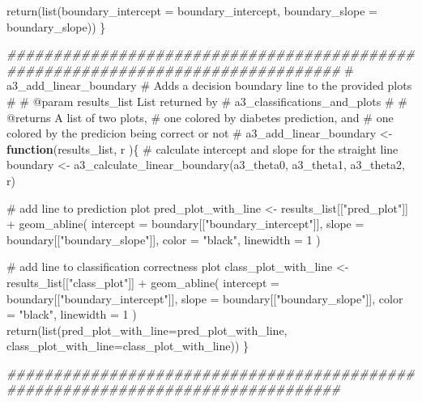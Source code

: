 \documentclass[
  english,
  11pt,
]{article}
\newenvironment{Shaded}{\begin{snugshade}}{\end{snugshade}}
\newcommand{\AttributeTok}[1]{\textcolor[rgb]{0.40,0.45,0.13}{#1}}
\newcommand{\CommentTok}[1]{\textcolor[rgb]{0.37,0.37,0.37}{#1}}
\newcommand{\ControlFlowTok}[1]{\textcolor[rgb]{0.00,0.23,0.31}{\textbf{#1}}}
\newcommand{\DecValTok}[1]{\textcolor[rgb]{0.68,0.00,0.00}{#1}}
\newcommand{\DocumentationTok}[1]{\textcolor[rgb]{0.37,0.37,0.37}{\textit{#1}}}
\newcommand{\FunctionTok}[1]{\textcolor[rgb]{0.28,0.35,0.67}{#1}}
\newcommand{\NormalTok}[1]{\textcolor[rgb]{0.00,0.23,0.31}{#1}}
\newcommand{\OtherTok}[1]{\textcolor[rgb]{0.00,0.23,0.31}{#1}}
\newcommand{\SpecialCharTok}[1]{\textcolor[rgb]{0.37,0.37,0.37}{#1}}
\newcommand{\StringTok}[1]{\textcolor[rgb]{0.13,0.47,0.30}{#1}}
\begin{document}
\begin{Shaded}
\begin{Highlighting}[]
  \FunctionTok{return}\NormalTok{(}\FunctionTok{list}\NormalTok{(}\AttributeTok{boundary\_intercept =}\NormalTok{ boundary\_intercept,}
              \AttributeTok{boundary\_slope =}\NormalTok{  boundary\_slope))}
\NormalTok{\}}

\DocumentationTok{\#\#\#\#\#\#\#\#\#\#\#\#\#\#\#\#\#\#\#\#\#\#\#\#\#\#\#\#\#\#\#\#\#\#\#\#\#\#\#\#\#\#\#\#\#\#\#\#\#\#\#\#\#\#\#\#\#\#\#\#\#\#\#\#\#\#\#\#\#\#\#\#\#\#\#\#\#\#\#\#}
\CommentTok{\#\textquotesingle{} a3\_add\_linear\_boundary}
\CommentTok{\#\textquotesingle{} Adds a decision boundary line to the provided plots}
\CommentTok{\#\textquotesingle{}}
\CommentTok{\#\textquotesingle{} @param results\_list List returned by}
\CommentTok{\#\textquotesingle{} a3\_classifications\_and\_plots}
\CommentTok{\#\textquotesingle{}}
\CommentTok{\#\textquotesingle{} @returns A list of two plots,}
\CommentTok{\#\textquotesingle{} one colored by diabetes prediction, and}
\CommentTok{\#\textquotesingle{} one colored by the predicion being correct or not}
\CommentTok{\#\textquotesingle{}}
\NormalTok{a3\_add\_linear\_boundary }\OtherTok{\textless{}{-}}  \ControlFlowTok{function}\NormalTok{(results\_list, r )\{}
  \CommentTok{\# calculate intercept and slope for the straight line}
\NormalTok{  boundary }\OtherTok{\textless{}{-}}
    \FunctionTok{a3\_calculate\_linear\_boundary}\NormalTok{(a3\_theta0, a3\_theta1, a3\_theta2, r)}

  \CommentTok{\# add line to prediction plot}
\NormalTok{  pred\_plot\_with\_line }\OtherTok{\textless{}{-}}
\NormalTok{    results\_list[[}\StringTok{"pred\_plot"}\NormalTok{]] }\SpecialCharTok{+}
    \FunctionTok{geom\_abline}\NormalTok{(}
      \AttributeTok{intercept =}\NormalTok{ boundary[[}\StringTok{"boundary\_intercept"}\NormalTok{]],}
      \AttributeTok{slope =}\NormalTok{ boundary[[}\StringTok{"boundary\_slope"}\NormalTok{]],}
      \AttributeTok{color =} \StringTok{"black"}\NormalTok{,}
      \AttributeTok{linewidth =} \DecValTok{1}
\NormalTok{    )}

  \CommentTok{\# add line to classification correctness plot}
\NormalTok{  class\_plot\_with\_line }\OtherTok{\textless{}{-}}
\NormalTok{    results\_list[[}\StringTok{"class\_plot"}\NormalTok{]] }\SpecialCharTok{+}
    \FunctionTok{geom\_abline}\NormalTok{(}
      \AttributeTok{intercept =}\NormalTok{ boundary[[}\StringTok{"boundary\_intercept"}\NormalTok{]],}
      \AttributeTok{slope =}\NormalTok{ boundary[[}\StringTok{"boundary\_slope"}\NormalTok{]],}
      \AttributeTok{color =} \StringTok{"black"}\NormalTok{,}
      \AttributeTok{linewidth =} \DecValTok{1}
\NormalTok{    )}
  \FunctionTok{return}\NormalTok{(}\FunctionTok{list}\NormalTok{(}\AttributeTok{pred\_plot\_with\_line=}\NormalTok{pred\_plot\_with\_line,}
              \AttributeTok{class\_plot\_with\_line=}\NormalTok{class\_plot\_with\_line))}
\NormalTok{\}}

\DocumentationTok{\#\#\#\#\#\#\#\#\#\#\#\#\#\#\#\#\#\#\#\#\#\#\#\#\#\#\#\#\#\#\#\#\#\#\#\#\#\#\#\#\#\#\#\#\#\#\#\#\#\#\#\#\#\#\#\#\#\#\#\#\#\#\#\#\#\#\#\#\#\#\#\#\#\#\#\#\#\#\#\#}
\end{Highlighting}
\end{Shaded}
\end{document}
